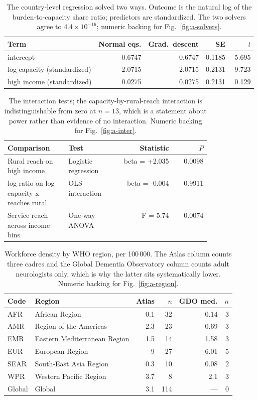 \documentclass[9pt,twoside]{pnas-new}
\begin{document}
\begin{table}[!ht]
\centering
\caption{The country-level regression solved two ways. Outcome is the natural log of the burden-to-capacity share ratio; predictors are standardized. The two solvers agree to $4.4\times10^{-16}$; numeric backing for Fig.~\ref{fig:a-solvers}.}
\label{tab:a-reg}
\small
\begin{tabular}{lrrrr}
\toprule
Term & Normal eqs. & Grad.\ descent & SE & $t$ \\
\midrule
intercept & 0.6747 & 0.6747 & 0.1185 & 5.695 \\
log capacity (standardized) & -2.0715 & -2.0715 & 0.2131 & -9.723 \\
high income (standardized) & 0.0275 & 0.0275 & 0.2131 & 0.129 \\
\bottomrule
\end{tabular}
\end{table}

\begin{table}[!ht]
\centering
\caption{The interaction tests; the capacity-by-rural-reach interaction is indistinguishable from zero at $n = 13$, which is a statement about power rather than evidence of no interaction. Numeric backing for Fig.~\ref{fig:a-inter}.}
\label{tab:a-inter}
\footnotesize
\begin{tabular}{p{0.30\linewidth}p{0.17\linewidth}rr}
\toprule
Comparison & Test & Statistic & $P$ \\
\midrule
Rural reach on high income & Logistic regression & beta = +2.035 & 0.0098 \\
log ratio on log capacity x reaches rural & OLS interaction & beta = -0.004 & 0.9911 \\
Service reach across income bins & One-way ANOVA & F = 5.74 & 0.0074 \\
\bottomrule
\end{tabular}
\end{table}

\begin{table}[!ht]
\centering
\caption{Workforce density by WHO region, per 100\,000. The Atlas column counts three cadres and the Global Dementia Observatory column counts adult neurologists only, which is why the latter sits systematically lower. Numeric backing for Fig.~\ref{fig:a-region}.}
\label{tab:a-region}
\small
\begin{tabular}{llrrrr}
\toprule
Code & Region & Atlas & $n$ & GDO med. & $n$ \\
\midrule
AFR & African Region & 0.1 & 32 & 0.14 & 3 \\
AMR & Region of the Americas & 2.3 & 23 & 0.69 & 3 \\
EMR & Eastern Mediterranean Region & 1.5 & 14 & 1.58 & 3 \\
EUR & European Region & 9 & 27 & 6.01 & 5 \\
SEAR & South-East Asia Region & 0.3 & 10 & 0.08 & 2 \\
WPR & Western Pacific Region & 3.7 & 8 & 2.1 & 3 \\
Global & Global & 3.1 & 114 & --- & 0 \\
\bottomrule
\end{tabular}
\end{table}
\end{document}
